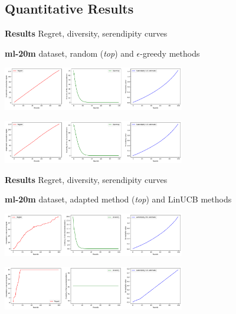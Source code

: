 \documentclass[10pt,frenchb]{beamer}
\begin{document}
\subsection{Quantitative Results}

\begin{frame}{\textbf{Results} Regret, diversity, serendipity curves}

\textbf{ml-20m} dataset, random (\emph{top}) and $\epsilon$-greedy methods

\begin{center}
\includegraphics[width=300px]{../../Results/ml-20m/random-48sec.png}
\end{center}
\begin{center}
\includegraphics[width=300px]{../../Results/ml-20m/greedy-2min16sec.png}
\end{center}

\end{frame}

\begin{frame}{\textbf{Results} Regret, diversity, serendipity curves}

\textbf{ml-20m} dataset, adapted method (\emph{top}) and LinUCB methods

\begin{center}
\includegraphics[width=300px]{../../Results/ml-20m/lagree-1min49sec.png}
\end{center}
\begin{center}
\includegraphics[width=300px]{../../Results/ml-20m/linUCB-53sec.png}
\end{center}

\end{frame}
\end{document}
